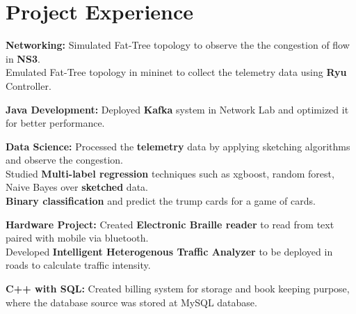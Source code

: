 \documentclass[10pt]{article}
\begin{document}
\section*{Project Experience}
\begin{shortlist}

\item {\bf Networking:} 
Simulated Fat-Tree topology to observe the the congestion of flow in {\bf NS3}.\\
Emulated Fat-Tree topology in mininet to collect the telemetry data using {\bf Ryu} Controller.
\item {\bf Java Development:} 
Deployed {\bf Kafka} system in Network Lab and optimized it for better performance.
\item {\bf Data Science:}
Processed the {\bf telemetry} data by applying sketching algorithms and observe the congestion.\\
 Studied {\bf Multi-label regression} techniques such as xgboost, random forest, Naive Bayes over {\bf sketched} data.\\
{\bf Binary classification } and predict the trump cards for a game of cards.
\item {\bf Hardware Project:}
Created {\bf Electronic Braille reader} to read from text paired with mobile via bluetooth.\\
Developed {\bf Intelligent Heterogenous Traffic Analyzer} to be deployed in roads to calculate traffic intensity.
\item {\bf C++ with SQL:} 
Created billing system for storage and book keeping purpose, where the database source was stored at MySQL database. 

\end{shortlist}

%
%
%

\end{document}
